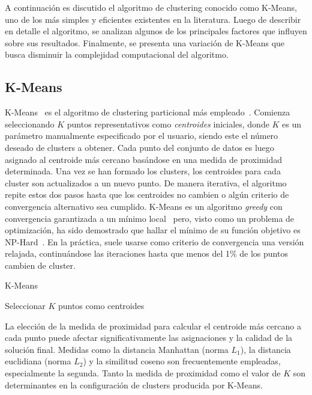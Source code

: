 A continuación es discutido el algoritmo de clustering conocido como K-Means, uno de los más simples y eficientes existentes en la literatura.
Luego de describir en detalle el algoritmo, se analizan algunos de los principales factores que influyen sobre sus resultados.
Finalmente, se presenta una variación de K-Means que busca disminuir la complejidad computacional del algoritmo.

\subsection{K-Means}\label{subsec:k-means}

K-Means~\cite{MacQueen67} es el algoritmo de clustering particional más empleado~\cite{Aggarawal13}.
Comienza seleccionando $K$ puntos representativos como \textit{centroides} iniciales, donde $K$ es un parámetro manualmente especificado por el usuario, siendo este el número deseado de clusters a obtener.
Cada punto del conjunto de datos es luego asignado al centroide más cercano basándose en una medida de proximidad determinada.
Una vez se han formado los clusters, los centroides para cada cluster son actualizados a un nuevo punto.
De manera iterativa, el algoritmo repite estos dos pasos hasta que los centroides no cambien o algún criterio de convergencia alternativo sea cumplido.
K-Means es un algoritmo \textit{greedy} con convergencia garantizada a un mínimo local~\cite{Selim84} pero, visto como un problema de optimización, ha sido demostrado que hallar el mínimo de su función objetivo es NP-Hard~\cite{Manning08}.
En la práctica, suele usarse como criterio de convergencia una versión relajada, continuándose las iteraciones hasta que menos del 1\% de los puntos cambien de cluster.

\begin{algorithm}
    \caption{K-Means}
    \label{algorithm:KMeans}
    Seleccionar $K$ puntos como centroides\;
\end{algorithm}

La elección de la medida de proximidad para calcular el centroide más cercano a cada punto puede afectar significativamente las asignaciones y la calidad de la solución final.
Medidas como la distancia Manhattan (norma $L_1$), la distancia euclidiana (norma $L_2$) y la similitud coseno son frecuentemente empleadas, especialmente la segunda.
Tanto la medida de proximidad como el valor de $K$ son determinantes en la configuración de clusters producida por K-Means.

